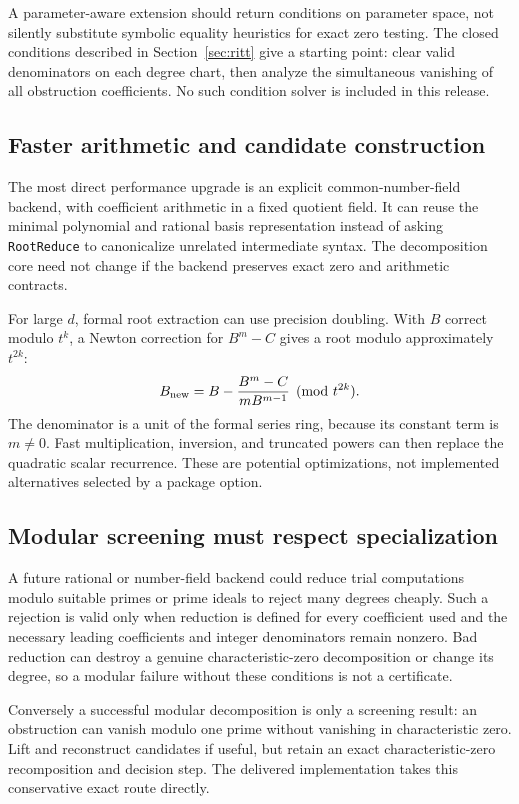 \documentclass[11pt,letterpaper]{article}
\theoremstyle{definition}
\theoremstyle{remark}
\newcommand{\wt}[1]{\texttt{#1}}
\begin{document}
A parameter-aware extension should return conditions on parameter space,
not silently substitute symbolic equality heuristics for exact zero
testing. The closed conditions described in Section~\ref{sec:ritt}
give a starting point: clear valid denominators on each degree chart,
then analyze the simultaneous vanishing of all obstruction coefficients.
No such condition solver is included in this release.

\subsection{Faster arithmetic and candidate construction}
The most direct performance upgrade is an explicit common-number-field
backend, with coefficient arithmetic in a fixed quotient field. It can
reuse the minimal polynomial and rational basis representation instead
of asking \wt{RootReduce} to canonicalize unrelated intermediate syntax.
The decomposition core need not change if the backend preserves exact
zero and arithmetic contracts.

For large $d$, formal root extraction can use precision doubling. With
$B$ correct modulo $t^k$, a Newton correction for $B^m-C$ gives a root
modulo approximately $t^{2k}$:
\[
 B_{\rm new}=B-\frac{B^m-C}{mB^{m-1}}\pmod{t^{2k}}.
\]
The denominator is a unit of the formal series ring, because its constant
term is $m\ne0$. Fast multiplication, inversion, and truncated powers can
then replace the quadratic scalar recurrence. These are potential
optimizations, not implemented alternatives selected by a package option.

\subsection{Modular screening must respect specialization}
A future rational or number-field backend could reduce trial computations
modulo suitable primes or prime ideals to reject many degrees cheaply.
Such a rejection is valid only when reduction is defined for every
coefficient used and the necessary leading coefficients and integer
denominators remain nonzero. Bad reduction can destroy a genuine
characteristic-zero decomposition or change its degree, so a modular
failure without these conditions is not a certificate.

Conversely a successful modular decomposition is only a screening result:
an obstruction can vanish modulo one prime without vanishing in
characteristic zero. Lift and reconstruct candidates if useful, but
retain an exact characteristic-zero recomposition and decision step.
The delivered implementation takes this conservative exact route directly.
\end{document}

